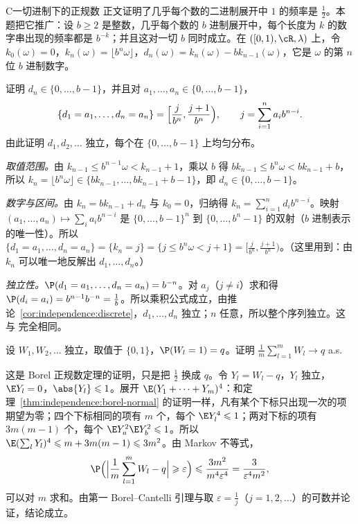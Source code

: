 \begin{probleme}{C}{一切进制下的正规数}
正文证明了几乎每个数的二进制展开中 $1$ 的频率是 $\frac12$。本题把它推广：设 $b\geqslant2$ 是整数，几乎每个数的 $b$ 进制展开中，每个长度为 $k$ 的数字串出现的频率都是 $b^{-k}$；并且这对一切 $b$ 同时成立。在 $([0,1),\cR,\lambda)$ 上，令 $k_0(\omega)=0$，$k_n(\omega)=\lfloor b^n\omega\rfloor$，$d_n(\omega)=k_n(\omega)-bk_{n-1}(\omega)$，它是 $\omega$ 的第 $n$ 位 $b$ 进制数字。
\begin{questions}
\item 证明 $d_n\in\{0,\dots,b-1\}$，并且对 $a_1,\dots,a_n\in\{0,\dots,b-1\}$，
\[
\{d_1=a_1,\dots,d_n=a_n\}=\Bigl[\frac j{b^n},\frac{j+1}{b^n}\Bigr),\qquad j=\sum_{i=1}^na_ib^{n-i}.
\]
由此证明 $d_1,d_2,\dots$ 独立，每个在 $\{0,\dots,b-1\}$ 上均匀分布。
\begin{solution}
\emph{取值范围。}由 $k_{n-1}\leqslant b^{n-1}\omega<k_{n-1}+1$，乘以 $b$ 得 $bk_{n-1}\leqslant b^n\omega<bk_{n-1}+b$，所以 $k_n=\lfloor b^n\omega\rfloor\in\{bk_{n-1},\dots,bk_{n-1}+b-1\}$，即 $d_n\in\{0,\dots,b-1\}$。

\emph{数字与区间。}由 $k_n=bk_{n-1}+d_n$ 与 $k_0=0$，归纳得 $k_n=\sum_{i=1}^nd_ib^{n-i}$。映射 $(a_1,\dots,a_n)\mapsto\sum_ia_ib^{n-i}$ 是 $\{0,\dots,b-1\}^n$ 到 $\{0,\dots,b^n-1\}$ 的双射（$b$ 进制表示的唯一性）。所以 $\{d_1=a_1,\dots,d_n=a_n\}=\{k_n=j\}=\{j\leqslant b^n\omega<j+1\}=[\frac j{b^n},\frac{j+1}{b^n})$。（这里用到：由 $k_n$ 可以唯一地反解出 $d_1,\dots,d_n$。）

\emph{独立性。}$\P(d_1=a_1,\dots,d_n=a_n)=b^{-n}$。对 $a_j$（$j\neq i$）求和得 $\P(d_i=a_i)=b^{n-1}b^{-n}=\frac1b$。所以乘积公式成立，由推论~\ref{cor:independence:discrete}，$d_1,\dots,d_n$ 独立；$n$ 任意，所以整个序列独立。这与 完全相同。
\end{solution}

\item 设 $W_1,W_2,\dots$ 独立，取值于 $\{0,1\}$，$\P(W_l=1)=q$。证明 $\frac1m\sum_{l=1}^mW_l\to q$ a.s.
\begin{solution}
这是 Borel 正规数定理的证明，只是把 $\frac12$ 换成 $q$。令 $Y_l=W_l-q$，$Y_l$ 独立，$\E Y_l=0$，$\abs{Y_l}\leqslant1$。展开 $\E(Y_1+\cdots+Y_m)^4$：和定理~\ref{thm:independence:borel-normal} 的证明一样，凡有某个下标只出现一次的项期望为零；四个下标相同的项有 $m$ 个，每个 $\E Y_l^4\leqslant1$；两对下标的项有 $3m(m-1)$ 个，每个 $\E Y_a^2\E Y_b^2\leqslant1$。所以 $\E(\sum_lY_l)^4\leqslant m+3m(m-1)\leqslant3m^2$。由 Markov 不等式，
\[
\P\Bigl(\Bigl\lvert\frac1m\sum_{l=1}^mW_l-q\Bigr\rvert\geqslant\varepsilon\Bigr)\leqslant\frac{3m^2}{m^4\varepsilon^4}=\frac3{\varepsilon^4m^2},
\]
可以对 $m$ 求和。由第一 Borel--Cantelli 引理与取 $\varepsilon=\frac1j$（$j=1,2,\dots$）的可数并论证，结论成立。
\end{solution}


\end{questions}
\end{probleme}
